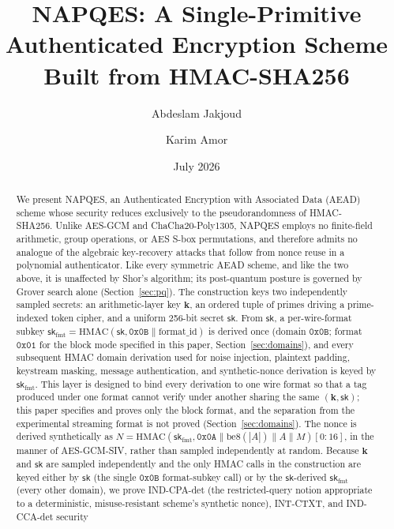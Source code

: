 \documentclass[11pt,a4paper]{article}
\title{\textbf{NAPQES: A Single-Primitive Authenticated Encryption Scheme\\
Built from HMAC-SHA256}}
\author[1]{Abdeslam Jakjoud}
\author[1]{Karim Amor}
\affil[1]{QAegis, France}
\date{July 2026}
\begin{document}
\maketitle

\begin{abstract}
We present NAPQES, an Authenticated Encryption with Associated Data (AEAD)
scheme whose security reduces exclusively to the pseudorandomness of
HMAC-SHA256.  Unlike AES-GCM and ChaCha20-Poly1305, NAPQES employs no
finite-field arithmetic, group operations, or AES S-box permutations, and
therefore admits no analogue of the algebraic key-recovery attacks that
follow from nonce reuse in a polynomial authenticator. Like every
symmetric AEAD scheme, and like the two above, it is unaffected by Shor's
algorithm; its post-quantum posture is governed by Grover search alone
(Section~\ref{sec:pq}).  The construction keys two independently sampled
secrets: an
arithmetic-layer key $\mathbf{k}$, an ordered tuple of primes driving a
prime-indexed token cipher, and a uniform 256-bit secret $\mathsf{sk}$.
From $\mathsf{sk}$, a per-wire-format subkey
$\mathsf{sk}_{\mathrm{fmt}}=\mathrm{HMAC}(\mathsf{sk},
\texttt{0x0B}\|\mathrm{format\_id})$ is derived once (domain
$\texttt{0x0B}$; format $\texttt{0x01}$ for the block mode specified in
this paper, Section~\ref{sec:domains}), and every subsequent HMAC domain
derivation used for noise injection, plaintext padding, keystream
masking, message authentication, and synthetic-nonce derivation is keyed
by $\mathsf{sk}_{\mathrm{fmt}}$. This layer is designed to bind every derivation to
one wire format so that a tag produced under one format cannot verify
under another sharing the same $(\mathbf{k},\mathsf{sk})$; this paper
specifies and proves only the block format, and the separation from the
experimental streaming format is not proved (Section~\ref{sec:domains}). The nonce is
derived synthetically as
$N=\mathrm{HMAC}(\mathsf{sk}_{\mathrm{fmt}},\texttt{0x0A}\|\mathrm{be8}(|A|)\|A\|M)[0{:}16]$,
in
the manner of AES-GCM-SIV, rather than sampled independently at random.
Because $\mathbf{k}$ and $\mathsf{sk}$ are sampled independently and the
only HMAC calls in the construction are keyed either by $\mathsf{sk}$
(the single $\texttt{0x0B}$ format-subkey call) or by the
$\mathsf{sk}$-derived $\mathsf{sk}_{\mathrm{fmt}}$ (every other domain),
we prove IND-CPA-det (the
restricted-query notion appropriate to a deterministic, misuse-resistant
scheme's synthetic nonce), INT-CTXT, and IND-CCA-det security

\end{abstract}
\end{document}
